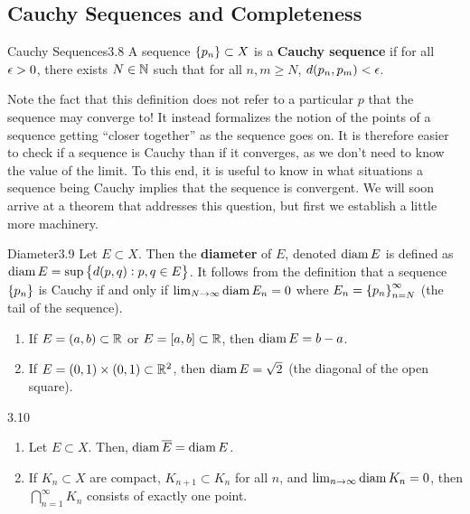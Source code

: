 \subsection{Cauchy Sequences and Completeness}

\setcounter{rudin}{7}
\begin{definition}{Cauchy Sequences}{3.8}
    A sequence $\set{p_n} \subset X$ is a \textbf{Cauchy sequence} if for all $\epsilon > 0$, there exists $N \in \mathbb{N}$ such that for all $n, m \geq N$, $d(p_n, p_m) < \epsilon$. 
\end{definition}
\noindent Note the fact that this definition does not refer to a particular $p$ that the sequence may converge to! It instead formalizes the notion of the points of a sequence getting ``closer together'' as the sequence goes on. It is therefore easier to check if a sequence is Cauchy than if it converges, as we don't need to know the value of the limit. To this end, it is useful to know in what situations a sequence being Cauchy implies that the sequence is convergent. We will soon arrive at a theorem that addresses this question, but first we establish a little more machinery.

\begin{definition}{Diameter}{3.9}
    Let $E \subset X$. Then the \textbf{diameter} of $E$, denoted $\operatorname{diam} E$ is defined as $\operatorname{diam} E = \sup\set{d(p, q): p, q \in E}$. It follows from the definition that a sequence $\set{p_n}$ is Cauchy if and only if $\lim_{N \rightarrow \infty} \operatorname{diam} E_n = 0$ where $E_n = \set{p_n}_{n=N}^\infty$ (the tail of the sequence).
\end{definition}

\begin{nexample}{}{}
    \begin{enumerate}
        \item If $E = (a, b) \subset \mathbb{R}$ or $E = [a, b] \subset \mathbb{R}$, then $\operatorname{diam} E = b - a$.
        \item If $E = (0, 1) \times (0,1) \subset \mathbb{R}^2$, then $\operatorname{diam} E = \sqrt{2}$ (the diagonal of the open square).
    \end{enumerate}
\end{nexample}

\begin{theorem}{}{3.10}
    \begin{enumerate}
        \item Let $E \subset X$. Then, $\operatorname{diam} \overline{E} = \operatorname{diam} E$.
        \item If $K_n \subset X$ are compact, $K_{n+1} \subset K_n$ for all $n$, and $\lim_{n \rightarrow \infty} \operatorname{diam} K_n  = 0$, then $\bigcap_{n=1}^\infty K_n$ consists of exactly one point.
    \end{enumerate}
\end{theorem}

